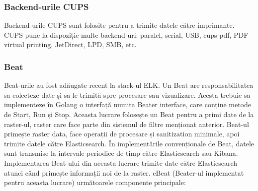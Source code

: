 \documentclass[a4paper, 12pt, twoside]{report}
\begin{document}
			\subsubsection{Backend-urile CUPS}
Backend-urile CUPS sunt folosite pentru a trimite datele către imprimante. CUPS pune la dispoziție multe backend-uri: paralel, serial, USB, cups-pdf, PDF virtual printing, JetDirect, LPD, SMB, etc.

		
			\subsubsection{Beat}
Beat-urile au fost adăugate recent la stack-ul ELK. Un Beat are responsabilitatea sa colecteze date și sa le trimită spre procesare sau vizualizare. Acesta trebuie sa implementeze în Golang o interfață numita Beater interface, care conține metode de Start, Run și Stop. Aceasta lucrare folosește un Beat pentru a primi date de la raster-ul, raster care face parte din sistemul de filtre menționat anterior. Beat-ul primește raster data, face operații de procesare și sanitization minimale, apoi trimite datele către Elasticsearch. În  implementările convenționale de Beat, datele sunt transmise la intervale periodice de timp către Elasticsearch sau Kibana. Implementarea Beat-ului din aceasta lucrare trimite date către Elasticsearch atunci când primește informații noi de la raster. cBeat (Beater-ul implementat pentru aceasta lucrare) următoarele componente principale:
\end{document}
